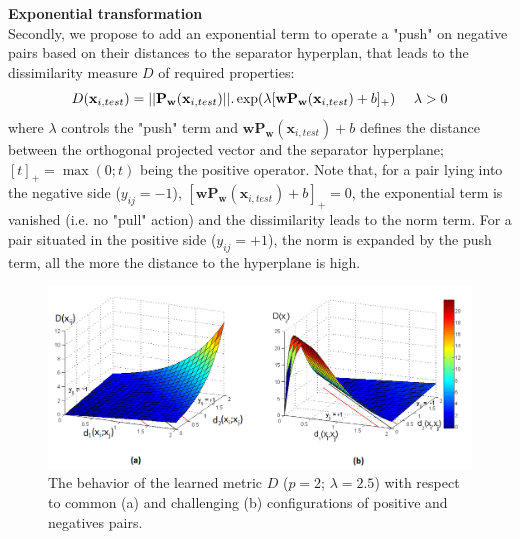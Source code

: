 \noindent \textbf{Exponential transformation} \\
Secondly, we propose to add an exponential term to operate a "push" on negative pairs based on their distances to the separator hyperplan, that leads to the dissimilarity measure $D$ of required properties:
\begin{equation}
	D(\textbf{x}_{i,test}) = 
	||\textbf{P}_\textbf{w}(\textbf{x}_{i,test})||.
	\exp(\lambda[\textbf{w}\textbf{P}_\textbf{w}(\textbf{x}_{i,test}) + b]_+)
	 \text{ \quad  } \lambda > 0
	\label{eq:dissimilarity_learn}
\end{equation}
where $\lambda$ controls the "push" term and $\textbf{w}\textbf{P}_\textbf{w}(\textbf{x}_{i,test}) + b$ defines the distance between the orthogonal projected vector and the separator hyperplane; $[t]_+ = \max(0; t)$ being the positive operator. Note that, for a pair lying into the negative side ($y_{ij} = -1$), $[\textbf{w}\textbf{P}_\textbf{w}(\textbf{x}_{i,test}) + b]_+ = 0$, the exponential term is vanished (i.e. no "pull" action) and the dissimilarity leads to the norm term. For a pair situated in the positive side ($y_{ij} = +1$), the norm is expanded by the push term, all the more the distance to the hyperplane is high.

\begin{figure}[h!]
	\centering
	\includegraphics[width=1\linewidth]{images/3D_diss}
	\caption{The behavior of the learned metric $D$ ($p = 2$; $\lambda = 2.5$) with respect to common (a) and challenging (b) configurations of positive and negatives pairs.}
	\label{fig:3D_diss}
\end{figure}


